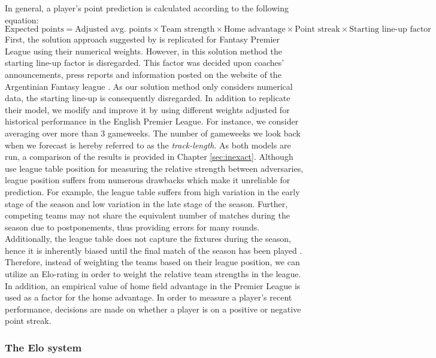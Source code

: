 In general, a player's point prediction is calculated according to the following equation:
\begin{equation}
    \textrm{Expected points} = \textrm{Adjusted avg. points} \times \textrm{Team strength} \times \textrm{Home advantage} \times \textrm{Point streak} \times \textrm{Starting line-up factor}
\end{equation}
\newpar
First, the solution approach suggested by \cite{Bonomo} is replicated for Fantasy Premier League using their numerical weights. However, in this solution method the starting line-up factor is disregarded. This factor was decided upon coaches' announcements, press reports and information posted on the website of the Argentinian Fantasy league \citep{Bonomo}. As our solution method only considers numerical data, the starting line-up is consequently disregarded. In addition to replicate their model, we modify and improve it by using different weights adjusted for historical performance in the English Premier League. For instance, we consider averaging over more than 3 gameweeks. The number of gameweeks we look back when we forecast is hereby referred to as the \textit{track-length}. As both models are run, a comparison of the results is provided in Chapter \ref{sec:inexact}. 
\newpar
Although \cite{Bonomo} use league table position for measuring the relative strength between adversaries, league position suffers from numerous drawbacks which make it unreliable for prediction. For example, the league table suffers from high variation in the early stage of the season and low variation in the late stage of the season. Further, competing teams may not share the equivalent number of matches during the season due to postponements, thus providing errors for many rounds. Additionally, the league table does not capture the fixtures during the season, hence it is inherently biased until the final match of the season has been played \citep{Constantinou}. Therefore, instead of weighting the teams based on their league position, we can utilize an Elo-rating in order to weight the relative team strengths in the league. In addition, an empirical value of home field advantage in the Premier League is used as a factor for the home advantage. In order to measure a player's recent performance, decisions are made on whether a player is on a positive or negative point streak.

\subsubsection{The Elo system}

